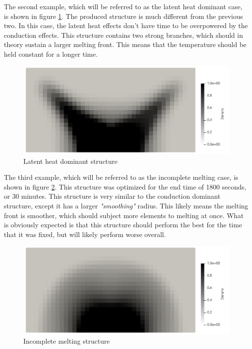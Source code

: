 The second example, which will be referred to as the latent heat dominant case, is shown in figure \ref{fig:latent_heat_dominant_structure}. The produced structure is much different from the previous two. In this case, the latent heat effects don't have time to be overpowered by the conduction effects. This structure contains two strong branches, which should in theory sustain a larger melting front. This means that the temperature should be held constant for a longer time.
\begin{figure}[ht]
  \centering
  \includegraphics[width=0.8\linewidth]{figures/chapter_4/PhaseChangeLatentHeatDominant.png}
  \caption{Latent heat dominant structure}
  \label{fig:latent_heat_dominant_structure}
\end{figure}

The third example, which will be referred to as the incomplete melting case, is shown in figure \ref{fig:incomplete_melting_structure}. This structure was optimized for the end time of 1800 seconds, or 30 minutes. This structure is very similar to the conduction dominant structure, except it has a larger \emph{"smoothing"} radius. This likely means the melting front is smoother, which should subject more elements to melting at once. What is obviously expected is that this structure should perform the best for the time that it was fixed, but will likely perform worse overall.
\begin{figure}[ht]
  \centering
  \includegraphics[width=0.8\linewidth]{figures/chapter_4/PhaseChangeIncompleteMelting.png}
  \caption{Incomplete melting structure}
  \label{fig:incomplete_melting_structure}
\end{figure}

